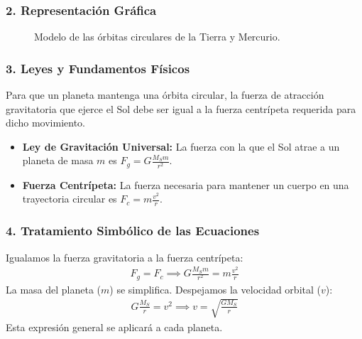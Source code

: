 \subsubsection*{2. Representación Gráfica}
\begin{figure}[H]
    \centering
    \caption{Modelo de las órbitas circulares de la Tierra y Mercurio.}
\end{figure}

\subsubsection*{3. Leyes y Fundamentos Físicos}
Para que un planeta mantenga una órbita circular, la fuerza de atracción gravitatoria que ejerce el Sol debe ser igual a la fuerza centrípeta requerida para dicho movimiento.
\begin{itemize}
    \item \textbf{Ley de Gravitación Universal:} La fuerza con la que el Sol atrae a un planeta de masa $m$ es $F_g = G \frac{M_S m}{r^2}$.
    \item \textbf{Fuerza Centrípeta:} La fuerza necesaria para mantener un cuerpo en una trayectoria circular es $F_c = m \frac{v^2}{r}$.
\end{itemize}

\subsubsection*{4. Tratamiento Simbólico de las Ecuaciones}
Igualamos la fuerza gravitatoria a la fuerza centrípeta:
\begin{gather}
    F_g = F_c \implies G \frac{M_S m}{r^2} = m \frac{v^2}{r}
\end{gather}
La masa del planeta ($m$) se simplifica. Despejamos la velocidad orbital ($v$):
\begin{gather}
    G \frac{M_S}{r} = v^2 \implies v = \sqrt{\frac{G M_S}{r}}
\end{gather}
Esta expresión general se aplicará a cada planeta.

